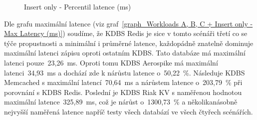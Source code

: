 \documentclass[czech,master,dept460,male,csharp,cpdeclaration]{diploma}
\begin{document}
	\begin{figure}
		\centering
		\caption{Insert only - Percentil latence (ms)}
		\label{graph_Insert only - Percentile Latency (ms)}
	\end{figure}
	
	Dle grafu maximální latence (viz graf~\ref{graph_Workloads A, B, C + Insert only - Max Latency (ms)}) soudíme, že KDBS Redis je sice v tomto scénáři třetí co se týče propustnosti a minimální i průměrné latence, každopádně znatelně dominuje maximální latenci zápisu oproti ostatním KDBS. Tato databáze má maximální latenci pouze~23,26~ms. Oproti tomu KDBS Aerospike má maximální latenci~34,93~ms a dochází zde k nárůstu latence o~50,22~\%. Následuje KDBS Memcached s maximální latencí~70,64~ms a nárůstem latence o~203,79~\% při porovnání s KDBS Redis. Poslední je KDBS Riak KV s naměřenou hodnotou maximální latence~325,89~ms, což je nárůst o~1300,73~\% a několikanásobně nejvyšší naměřená latence napříč testy všech databází ve všech čtyřech scénářích.
	
\end{document}
